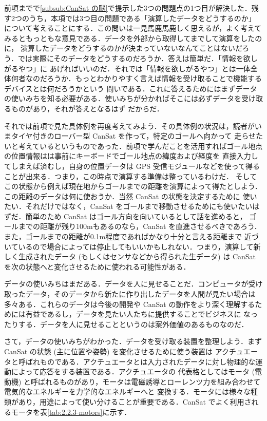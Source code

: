 \documentclass[dvipdfmx]{jsbook}
\begin{document}
  前項までで\ref{subsub:CanSat の脳}で提示した3つの問題点の1つ目が解決した．残す2つのうち，本項では3つ目の問題である「演算したデータをどうするのか」
  について考えることにする．この問いは一見馬鹿馬鹿しく思えるが，よく考えてみるともっともな意見である．データを外部から取得してまでして演算をしたのに，
  演算したデータをどうするのかが決まっていないなんてことはないだろう．では実際にそのデータをどうするのだろうか．答えは簡単だ．「情報を欲しがるやつ」に
  あげればいいのだ．それでは「情報を欲しがるやつ」とは一体全体何者なのだろうか．もっとわかりやすく言えば情報を受け取ることで機能するデバイスとは何だろうかという
  問いである．これに答えるためにはまずデータの使いみちを知る必要がある．使いみちが分かればそこには必ずデータを受け取るものがあり，それが答えとなるはず
  だからだ．

  それでは前項で見た具体例を再度考えてみよう．その具体例の状況は，読者がいまタイヤ付きのローバー型 CanSat を作って，特定のゴールへ向かって
  走らせたいと考えているというものであった．前項で学んだことを活用すればゴール地点の位置情報はは事前にキーボードでゴール地点の緯度および経度を
  直接入力してしまえば済むし，自身の位置データは GPS 受信モジュールなどを使って得ることが出来る．つまり，この時点で演算する準備は整っているわけだ．
  そしてこの状態から例えば現在地からゴールまでの距離を演算によって得たとしよう．この距離のデータは何に使おうか．当然 CanSat の状態を決定するために
  使いたい．それだけではなく，CanSat をゴールまで移動させるためにも使いたいはずだ．簡単のため CanSat はゴール方向を向いているとして話を進めると，
  ゴールまでの距離が残り100mもあるのなら，CanSat を直進させるべきであろう．また，ゴールまでの距離が0.1m程度であればかなり十分と言える距離まで
  近づいているので場合によっては停止してもいいかもしれない．つまり，演算して新しく生成されたデータ (もしくはセンサなどから得られた生データ) は
  CanSat を次の状態へと変化させるために使われる可能性がある．

  データの使いみちはまだある．データを人に見せることだ．コンピュータが受け取ったデータ，そのデータから新たに作り出したデータを人間が見たい場合は
  多々ある．これらのデータは今後の開発や CanSat の動作をより深く理解するためには有益であるし，データを見たい人たちに提供することでビジネスに
  なったりする．データを人に見せることというのは案外価値のあるものなのだ．

  さて，データの使いみちがわかった．データを受け取る装置を整理しよう．まず CanSat の状態 (主に位置や姿勢) を変化させるために使う装置は
  アクチュエータと呼ばれものである．アクチュエータとは入力されたデータに対し物理的な運動によって応答をする装置である．アクチュエータの
  代表格としてはモータ (電動機) と呼ばれるものがあり，モータは電磁誘導とローレンツ力を組み合わせて電気的なエネルギーを力学的なエネルギーへと
  変換する．モータには様々な種類があり，用途によって使い分けることが重要である．CanSat でよく利用されるモータを表\ref{tab:2.2.3-motors}に示す．
\end{document}
